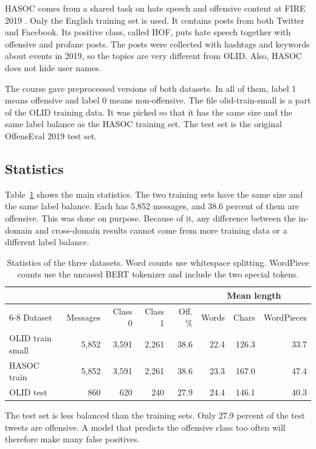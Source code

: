 \documentclass[11pt,a4paper]{article}
\begin{document}
HASOC comes from a shared task on hate speech and offensive content at FIRE 2019 \citep{mandl2019hasoc}. Only the English training set is used. It contains posts from both Twitter and Facebook. Its positive class, called HOF, puts hate speech together with offensive and profane posts. The posts were collected with hashtags and keywords about events in 2019, so the topics are very different from OLID. Also, HASOC does not hide user names.

The course gave preprocessed versions of both datasets. In all of them, label 1 means offensive and label 0 means non-offensive. The file olid-train-small is a part of the OLID training data. It was picked so that it has the same size and the same label balance as the HASOC training set. The test set is the original OffensEval 2019 test set.

\subsection{Statistics}

Table~\ref{tab:data-stats} shows the main statistics. The two training sets have the same size and the same label balance. Each has 5,852 messages, and 38.6 percent of them are offensive. This was done on purpose. Because of it, any difference between the in-domain and cross-domain results cannot come from more training data or a different label balance.

\begin{table}[H]
\centering
\caption{Statistics of the three datasets. Word counts use whitespace splitting. WordPiece counts use the uncased BERT tokenizer and include the two special tokens.}
\label{tab:data-stats}
\begin{tabular}{lrrrrrrr}
\toprule
 & & & & & \multicolumn{3}{c}{Mean length} \\
\cmidrule(lr){6-8}
Dataset & Messages & Class 0 & Class 1 & Off. \% & Words & Chars & WordPieces \\
\midrule
OLID train small & 5,852 & 3,591 & 2,261 & 38.6 & 22.4 & 126.3 & 33.7 \\
HASOC train      & 5,852 & 3,591 & 2,261 & 38.6 & 23.3 & 167.0 & 47.4 \\
OLID test        & 860   & 620   & 240   & 27.9 & 24.4 & 146.1 & 40.3 \\
\bottomrule
\end{tabular}
\end{table}

The test set is less balanced than the training sets. Only 27.9 percent of the test tweets are offensive. A model that predicts the offensive class too often will therefore make many false positives.
\end{document}
